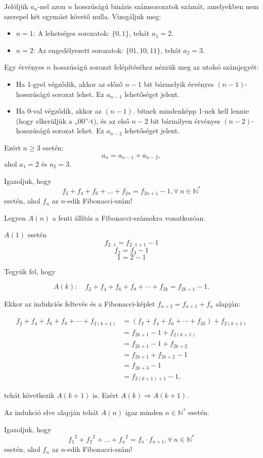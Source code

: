 \begin{solution}
Jelöljük $a_{n}$-nel azon $n$ hosszúságú bináris számsorozatok számát,
amelyekben nem szerepel két egymást követő nulla. Vizsgáljuk meg:
\begin{itemize}
\item $n=1$: A lehetséges sorozatok: $\{0,1\}$, tehát $a_{1}=2$. 
\item $n=2$: Az engedélyezett sorozatok: $\{01,10,11\}$, tehát $a_{2}=3$. 
\end{itemize}
Egy érvényes $n$ hosszúságú sorozat felépítéséhez nézzük meg az utolsó
számjegyét:
\begin{itemize}
\item Ha 1-gyel végződik, akkor az előző $n-1$ bit bármelyik érvényes $(n-1)$-hosszúságú
sorozat lehet. Ez $a_{n-1}$ lehetőséget jelent. 
\item Ha 0-val végződik, akkor az $(n-1)$. bitnek mindenképp 1-nek kell
lennie (hogy elkerüljük a „00”-t), és az első $n-2$ bit bármilyen
érvényes $(n-2)$-hosszúságú sorozat lehet. Ez $a_{n-2}$ lehetőséget
jelent. 
\end{itemize}
Ezért $n\ge3$ esetén: 
\[
a_{n}=a_{n-1}+a_{n-2},
\]
ahol $a_{1}=2$ és $a_{2}=3$. 
\end{solution}
\begin{problem}
Igazoljuk, hogy 
\[
f_{2}+f_{4}+f_{6}+...+f_{2n}=f_{2n+1}-1,\forall\ n\in\mathbb{N}^{*}
\]
esetén, ahol $f_{n}$ az $n$-edik Fibonacci-szám! 
\end{problem}

\begin{solution}
Legyen $A(n)$ a fenti állítás a Fibonacci-számokra vonatkozóan.

$A(1)$ esetén 
\[
f_{2\cdot1}=f_{2\cdot1+1}-1
\]
\[
f_{2}=f_{3}-1
\]
\[
1=2-1
\]

\noindent Tegyük fel, hogy

\[
A(k):\quad f_{2}+f_{4}+f_{6}+f_{8}+\cdots+f_{2k}=f_{2k+1}-1.
\]

\noindent Ekkor az indukciós feltevés és a Fibonacci-képlet $f_{n+2}=f_{n+1}+f_{n}$
alapján:

\[
\begin{aligned}f_{2}+f_{4}+f_{6}+f_{8}+\cdots+f_{2(k+1)} & =(f_{2}+f_{4}+f_{6}+\cdots+f_{2k})+f_{2(k+1)}\\
 & =f_{2k+1}-1+f_{2(k+1)}\\
 & =f_{2k+1}-1+f_{2k+2}\\
 & =f_{2k+1}+f_{2k+2}-1\\
 & =f_{2k+3}-1\\
 & =f_{2(k+1)+1}-1,
\end{aligned}
\]

tehát következik $A(k+1)$ is. Ezért $A(k)\Rightarrow A(k+1)$.

Az indukció elve alapján tehát $A(n)$ igaz minden $n\in\mathbb{N}^{*}$
esetén.
\end{solution}
\begin{problem}
Igazoljuk, hogy 
\[
{f_{1}}^{2}+{f_{2}}^{2}+...+{f_{n}}^{2}=f_{n}\cdot f_{n+1},\forall\ n\in\mathbb{N}^{*}
\]
esetén, ahol $f_{n}$ az $n$-edik Fibonacci-szám! 
\end{problem}

